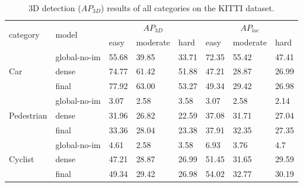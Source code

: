 \documentclass[10pt,twocolumn,letterpaper]{article}
\begin{document}
\begin{table}[!t]
\centering
\caption{3D detection ($AP_{3D}$) results of all categories on the KITTI dataset.}
\label{table:kitti-all-supp}
\begin{tabular}{|l|l|lll|lll|}
\hline
\multirow{2}{*}{category}   & \multirow{2}{*}{model} & \multicolumn{3}{c|}{$AP_{3D}$} & \multicolumn{3}{c|}{$AP_{loc}$} \\ \cline{3-8} 
                            &                        & easy    & moderate   & hard    & easy     & moderate   & hard    \\ \hline
\multirow{3}{*}{Car}        & global-no-im           & 55.68   & 39.85      & 33.71   & 72.35    & 55.42      & 47.41   \\
                            & dense                  & 74.77   & 61.42      & 51.88   & 47.21    & 28.87      & 26.99    \\
                            & final                  & 77.92   & 63.00         & 53.27   & 49.34    & 29.42      & 26.98   \\ \hline
\multirow{3}{*}{Pedestrian} & global-no-im           & 3.07    & 2.58       & 3.58    & 3.07     & 2.58       & 2.14    \\
                            & dense                  & 31.96   & 26.82      & 22.59   & 37.08    & 31.71      & 27.04   \\
                            & final                  & 33.36   & 28.04      & 23.38   & 37.91    & 32.35      & 27.35   \\ \hline
\multirow{3}{*}{Cyclist}    & global-no-im           & 4.61    & 2.58       & 3.58    & 6.93     & 3.76       & 4.7     \\
                            & dense                  & 47.21   & 28.87      & 26.99   & 51.45    & 31.65      & 29.59  \\
                            & final                  & 49.34   & 29.42      & 26.98   & 54.02    & 32.77      & 30.19   \\ \hline
\end{tabular}
\end{table}
\end{document}
